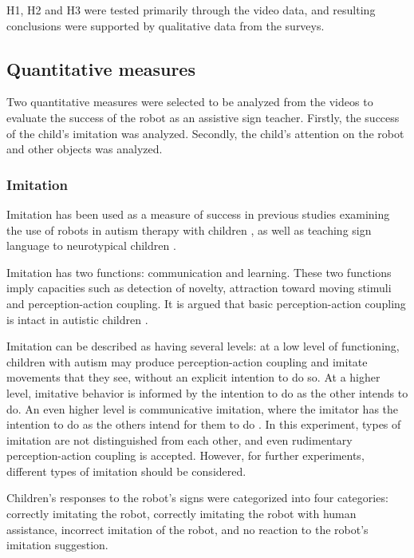 H1, H2 and H3 were tested primarily through the video data, and resulting conclusions were supported by qualitative data from the surveys.


\subsection{Quantitative measures}

Two quantitative measures were selected to be analyzed from the videos to evaluate the success of the robot as an assistive sign teacher. Firstly, the success of the child's imitation was analyzed. Secondly, the child's attention on the robot and other objects was analyzed.


\subsubsection{Imitation}

Imitation has been used as a measure of success in previous studies examining the use of robots in autism therapy with children \cite{robins2004effects, robins2006appearance, goodrich2012incorporating, duquette2008exploring, boccanfuso2017low}, as well as teaching sign language to neurotypical children \cite{taleofarobot, uluer2015new}.

Imitation has two functions: communication and learning. These two functions imply capacities such as detection of novelty, attraction toward moving stimuli and perception-action coupling. It is argued that basic perception-action coupling is intact in autistic children \cite{nadel2004toward}.

Imitation can be described as having several levels: at a low level of functioning, children with autism may produce perception-action coupling and imitate movements that they see, without an explicit intention to do so. At a higher level, imitative behavior is informed by the intention to do as the other intends to do. An even higher level is communicative imitation, where the imitator has the intention to do as the others intend for them to do \cite{meltzoff2002imitative}. In this experiment, types of imitation are not distinguished from each other, and even rudimentary perception-action coupling is accepted. However, for further experiments, different types of imitation should be considered.

Children's responses to the robot's signs were categorized into four categories: correctly imitating the robot, correctly imitating the robot with human assistance, incorrect imitation of the robot, and no reaction to the robot's imitation suggestion.

